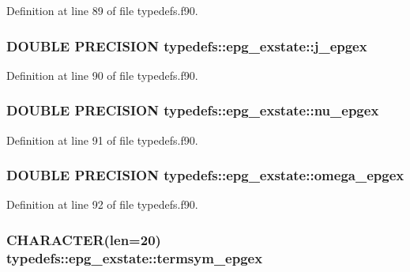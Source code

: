 Definition at line 89 of file typedefs.f90.\hypertarget{typetypedefs_1_1epg__exstate_ab752c0ea7171e84c8846f5b45373321c}{
\subsubsection[{j\_\-epgex}]{\setlength{\rightskip}{0pt plus 5cm}DOUBLE PRECISION {\bf typedefs::epg\_\-exstate::j\_\-epgex}}}
\label{typetypedefs_1_1epg__exstate_ab752c0ea7171e84c8846f5b45373321c}


Definition at line 90 of file typedefs.f90.\hypertarget{typetypedefs_1_1epg__exstate_a10f13ccae9fbfd2620616a1d6f7d7d46}{
\subsubsection[{nu\_\-epgex}]{\setlength{\rightskip}{0pt plus 5cm}DOUBLE PRECISION {\bf typedefs::epg\_\-exstate::nu\_\-epgex}}}
\label{typetypedefs_1_1epg__exstate_a10f13ccae9fbfd2620616a1d6f7d7d46}


Definition at line 91 of file typedefs.f90.\hypertarget{typetypedefs_1_1epg__exstate_a46024cb2b6ef6bd809a2ee3d43769b60}{
\subsubsection[{omega\_\-epgex}]{\setlength{\rightskip}{0pt plus 5cm}DOUBLE PRECISION {\bf typedefs::epg\_\-exstate::omega\_\-epgex}}}
\label{typetypedefs_1_1epg__exstate_a46024cb2b6ef6bd809a2ee3d43769b60}


Definition at line 92 of file typedefs.f90.\hypertarget{typetypedefs_1_1epg__exstate_abb12fa8ac79b7b77d90f7dd1f0519222}{
\subsubsection[{termsym\_\-epgex}]{\setlength{\rightskip}{0pt plus 5cm}CHARACTER(len=20) {\bf typedefs::epg\_\-exstate::termsym\_\-epgex}}}
\label{typetypedefs_1_1epg__exstate_abb12fa8ac79b7b77d90f7dd1f0519222}


